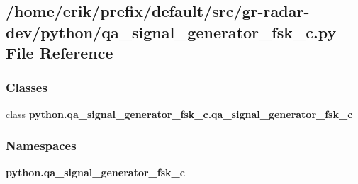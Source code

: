 \subsection{/home/erik/prefix/default/src/gr-\/radar-\/dev/python/qa\+\_\+signal\+\_\+generator\+\_\+fsk\+\_\+c.py File Reference}
\label{qa__signal__generator__fsk__c_8py}
\subsubsection*{Classes}
\begin{DoxyCompactItemize}
\item 
class {\bf python.\+qa\+\_\+signal\+\_\+generator\+\_\+fsk\+\_\+c.\+qa\+\_\+signal\+\_\+generator\+\_\+fsk\+\_\+c}
\end{DoxyCompactItemize}
\subsubsection*{Namespaces}
\begin{DoxyCompactItemize}
\item 
 {\bf python.\+qa\+\_\+signal\+\_\+generator\+\_\+fsk\+\_\+c}
\end{DoxyCompactItemize}
